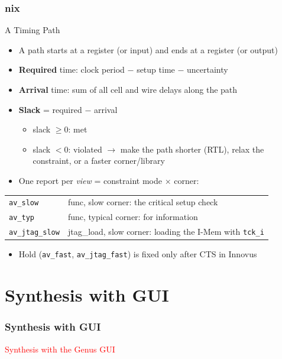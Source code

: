 \documentclass{beamer}
\newcommand{\astitle}{nix}
\newcommand{\assubtitle}{nix}
\newcommand{\cmd}[1]{\texttt{#1}}
\begin{document}
\renewcommand{\assubtitle}{A Timing Path}
\begin{frame}
\frametitle{\astitle}
\begin{block}{\assubtitle}
  \footnotesize
  \begin{itemize}
    \item A path starts at a register (or input) and ends at a register (or output)
    \item \textbf{Required} time: clock period $-$ setup time $-$ uncertainty
    \item \textbf{Arrival} time: sum of all cell and wire delays along the path
    \item \textbf{Slack} = required $-$ arrival
    \begin{itemize}
      \item slack $\ge 0$: met
      \item slack $< 0$: violated $\rightarrow$ make the path shorter (RTL),
        relax the constraint, or a faster corner/library
    \end{itemize}
    \item One report per \emph{view} = constraint mode $\times$ corner:
  \end{itemize}
  \begin{tabularx}{\linewidth}{@{}lY@{}}
    \cmd{av\_slow}      & func, slow corner: the critical setup check\\
    \cmd{av\_typ}       & func, typical corner: for information\\
    \cmd{av\_jtag\_slow}& jtag\_load, slow corner: loading the I-Mem with \cmd{tck\_i}\\
  \end{tabularx}
  \begin{itemize}
    \item Hold (\cmd{av\_fast}, \cmd{av\_jtag\_fast}) is fixed only after CTS in Innovus
  \end{itemize}
\end{block}
\end{frame}

\section{Synthesis with GUI}
\renewcommand{\astitle}{Synthesis with GUI}
\begin{frame}
\frametitle{\astitle}
\textcolor{red}{Synthesis with the Genus GUI}
\end{frame}
\end{document}
